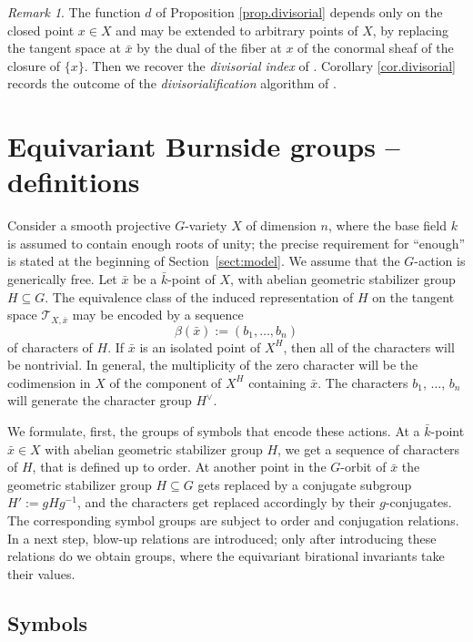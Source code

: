 \documentclass[12pt,reqno]{amsart}
\theoremstyle{plain}
\theoremstyle{remark}
\newtheorem{rema}[prop]{Remark}
\theoremstyle{definition}
\numberwithin{equation}{section}
\newcommand{\cT}{{\mathcal T}}
\begin{document}
\begin{rema}
\label{rem.divisorial}
The function $d$ of Proposition \ref{prop.divisorial} depends only on the closed point $x\in X$ and may be extended to arbitrary points of $X$, by replacing the tangent space at $\bar x$ by the dual of the fiber at $x$ of the conormal sheaf of the closure of $\{x\}$.
Then we recover the \emph{divisorial index} of \cite{berghrydh}.
Corollary \ref{cor.divisorial} records the outcome of the \emph{divisorialification} algorithm of \cite[Thm.\ A]{berghrydh}.
\end{rema}

\section{Equivariant Burnside groups -- definitions}
\label{sect:defi}
Consider a smooth projective $G$-variety $X$ of dimension $n$, where the base field $k$ is assumed to contain enough roots of unity; the precise requirement for ``enough'' is stated at the beginning of Section~\ref{sect:model}. 
We assume that the $G$-action is generically free.
Let $\bar x$ be a $\bar k$-point of $X$, with abelian geometric stabilizer group $H\subseteq G$.
The equivalence class of the induced representation of $H$ on the tangent space $\cT_{X,\bar x}$ may be encoded by a sequence
$$
\beta(\bar x):=(b_1,\ldots, b_n) 
$$
of characters of $H$.
If $\bar x$ is an isolated point of $X^H$, then all of the characters will be nontrivial. 
In general, the multiplicity of the zero character will be the
codimension in $X$ of the component of $X^H$ containing $\bar x$.
The characters $b_1$, $\dots$, $b_n$ will generate the character group $H^\vee$.

We formulate, first, the groups of symbols that encode these actions.
At a $\bar k$-point $\bar x\in X$
with abelian geometric stabilizer group $H$, we get a sequence of characters of $H$, that is defined up to order.
At another point in the $G$-orbit of $\bar x$ the geometric stabilizer group $H\subseteq G$ gets replaced by a conjugate subgroup $H':=gHg^{-1}$,
and the characters get replaced accordingly by their $g$-conjugates.
The corresponding symbol groups are subject to order and conjugation relations.
In a next step, blow-up relations are introduced; only after introducing these relations do we obtain groups, where the equivariant birational invariants take their values.

\subsection{Symbols}
\label{ss.symbols}
\end{document}

